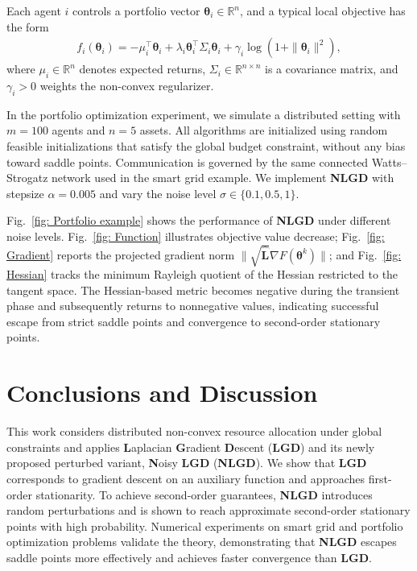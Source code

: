 \documentclass{siamart251216}
\begin{document}
Each agent $i$ controls a portfolio vector $\boldsymbol{\theta}_{i} \in \mathbb{R}^{n}$, and a typical local objective has the form
\begin{gather*}
    f_{i}(\boldsymbol{\theta}_{i})
    = -\mu_{i}^{\top} \boldsymbol{\theta}_{i}
    + \lambda_{i} \boldsymbol{\theta}_{i}^{\top} \Sigma_{i} \boldsymbol{\theta}_{i}
    + \gamma_{i} \log(1 + \|\boldsymbol{\theta}_{i}\|^{2}),
\end{gather*}
where $\mu_{i} \in \mathbb{R}^{n}$ denotes expected returns, $\Sigma_{i} \in \mathbb{R}^{n \times n}$ is a covariance matrix, and $\gamma_i > 0$ weights the non-convex regularizer.

In the portfolio optimization experiment, we simulate a distributed setting with $m = 100$ agents and $n = 5$ assets. All algorithms are initialized using random feasible initializations that satisfy the global budget constraint, without any bias toward saddle points. Communication is governed by the same connected Watts--Strogatz network used in the smart grid example. We implement \textbf{NLGD} with stepsize $\alpha = 0.005$ and vary the noise level $\sigma \in \{0.1, 0.5, 1\}$.

Fig.~\ref{fig: Portfolio example} shows the performance of \textbf{NLGD} under different noise levels. Fig.~\ref{fig: Function} illustrates objective value decrease; Fig.~\ref{fig: Gradient} reports the projected gradient norm
$\|\sqrt{\hat{\mathbf{L}}}\nabla F(\boldsymbol{\theta}^k)\|$; and Fig.~\ref{fig: Hessian} tracks the minimum Rayleigh quotient of the Hessian restricted to the tangent space. The Hessian-based metric becomes negative during the transient phase and subsequently returns to nonnegative values, indicating successful escape from strict saddle points and convergence to second-order stationary points.




\section{Conclusions and Discussion}
\label{sec: Conclusions and Discussion}
This work considers distributed non-convex resource allocation under global constraints and applies \textbf{L}aplacian \textbf{G}radient \textbf{D}escent (\textbf{LGD}) and its newly proposed perturbed variant, \textbf{N}oisy \textbf{LGD} (\textbf{NLGD}). We show that \textbf{LGD} corresponds to gradient descent on an auxiliary function and approaches first-order stationarity. To achieve second-order guarantees, \textbf{NLGD} introduces random perturbations and is shown to reach approximate second-order stationary points with high probability. Numerical experiments on smart grid and portfolio optimization problems validate the theory, demonstrating that \textbf{NLGD} escapes saddle points more effectively and achieves faster convergence than \textbf{LGD}.
\end{document}
